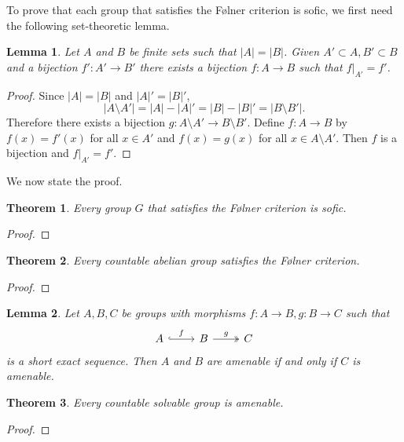 \documentclass[titlepage, a4paper]{article}
\newcommand{\card}[1]{\left| #1 \right|}
\newtheorem{theorem}{Theorem}
\newtheorem{lemma}{Lemma}
\theoremstyle{remark}
\begin{document}

To prove that each group that satisfies the Følner criterion is sofic, we first need the following set-theoretic lemma.

\begin{lemma}\label{lem:finite_bijections} 
        Let $A$ and $B$ be finite sets such that $|A| = |B|$. Given $A' \subset A, B' \subset B$ and a bijection $f': A' \to B'$ there exists a bijection $f: A \to B$ such that $f|_{A'} = f'$. 
    \end{lemma}
    \begin{proof}
        Since $\card A = \card B$ and $\card A' = \card B'$,
        \[
        \card{A \setminus A'} = \card A - \card A' = \card B - \card B' = \card{B \setminus B'}.
        \]
        Therefore there exists a bijection $g: A \setminus A' \to B \setminus B'$. Define $f: A  \to B$ by $f(x) = f'(x)$ for all $x \in A'$ and $f(x)=g(x)$ for all $x \in A \setminus A'$. Then $f$ is a bijection and $f|_{A'} = f'$.
    \end{proof}

We now state the proof.

 	\begin{theorem}
        Every group $G$ that satisfies the Følner criterion is sofic.
    \end{theorem}
    \begin{proof}
        
 	\end{proof}

    \begin{theorem}\label{thm:countable_abelian_folner}
        Every countable abelian group satisfies the Følner criterion. 
    \end{theorem}
    \begin{proof}
        
    \end{proof}

    \begin{lemma}
        \label{lem:amenable_short_exact_sequence}
        Let $A, B, C$ be groups with morphisms $f:A\to B, g:B\to C$ such that
        \[\begin{tikzcd}
            A \arrow[r, "f", hook] & B \arrow[r, "g", two heads] & C
        \end{tikzcd}\] is a short exact sequence. Then $A$ and $B$ are amenable if and only if $C$ is amenable.
    \end{lemma}
    \begin{theorem}
        Every countable solvable group is amenable. 
    \end{theorem}
    \begin{proof}
        
    \end{proof}
\end{document}
